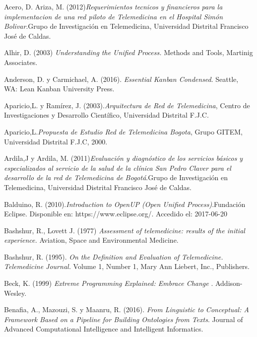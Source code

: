 \begin{thebibliography}{}

 Acero, D. Ariza, M. (2012)\textit{Requerimientos tecnicos y financieros para la implementacion de una red piloto de Telemedicina en el Hospital Simón Bolivar}.Grupo de Investigación en Telemedicina,  Universidad Distrital Francisco José de Caldas.

 Alhir, D. (2003) \textit{Understanding the Unified Process.} Methods and Tools, Martinig Associates.

 Anderson, D. y Carmichael, A. (2016). \textit{Essential Kanban Condensed}. Seattle, WA: Lean Kanban University Press.

 Aparicio,L. y Ramírez, J. (2003).\textit{Arquitectura de Red de Telemedicina}, Centro de Investigaciones y Desarrollo Científico, Universidad Distrital F.J.C.

 Aparicio,L.\textit{Propuesta de Estudio Red de Telemedicina Bogota}, Grupo GITEM, Universidad Distrital F.J.C, 2000.

 Ardila,J y Ardila, M. (2011)\textit{Evaluación y diagnóstico de los servicios básicos y especializados al servicio de la salud de la clínica San Pedro Claver para el desarrollo de la red de Telemedicina de Bogotá}.Grupo de Investigación en Telemedicina,  Universidad Distrital Francisco José de Caldas.

 Balduino, R. (2010).\textit{Introduction to OpenUP (Open Unified Process)}.Fundación Eclipse. Disponible en: https://www.eclipse.org/. Accedido el: 2017-06-20

 Bashshur, R., Lovett J. (1977) \textit{Assessment of telemedicine: results of the initial experience.} Aviation, Space and Environmental Medicine.

 Bashshur, R. (1995). \textit{On the Definition and Evaluation of Telemedicine. Telemedicine Journal.} Volume 1, Number 1, Mary Ann Liebert, Inc., Publishers.

 Beck, K. (1999) \textit{ Extreme Programming Explained: Embrace Change }. Addison-Wesley. 

 Benafia, A., Mazouzi, S. y Maanru, R. (2016). \textit{From Linguistic to Conceptual: A Framework Based on a Pipeline for Building Ontologies from Texts}. Journal of Advanced Computational Intelligence and Intelligent Informatics.


\end{thebibliography}
